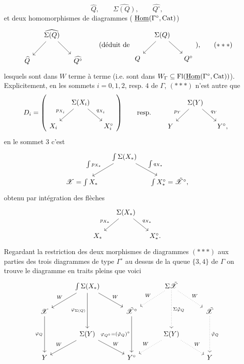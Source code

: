 \[
\widehat{Q}, \qquad \widehat{\Sigma(Q)}, \qquad \widehat{Q^\circ},
\]
et deux homomorphismes de diagrammes ( $\underline{\mathrm{Hom}}(\Gamma^\circ,\mathrm{Cat})$)
\[
\begin{tikzcd}[column sep=small]
 & \widehat{\Sigma(Q)} \arrow[dl] \arrow[dr] & \\
\widehat{Q} & & \widehat{Q^\circ}
\end{tikzcd}
\qquad
\text{(déduit de }
\begin{tikzcd}[column sep=small]
 & \Sigma(Q) \arrow[dl] \arrow[dr] & \\
Q & & Q^\circ
\end{tikzcd}
\text{),}
\tag*{$(***)$}
\]
lesquels sont dans $W$ terme à terme (i.e. sont dans $W_\Gamma\subseteq\mathrm{Fl}(\underline{\mathrm{Hom}}(\Gamma^\circ,\mathrm{Cat}))$). Explicitement, en les sommets $i=0,1,2$, resp. $4$ de $\Gamma$, $(***)$ n'est autre que
\[
D_i =
\left(
\begin{tikzcd}[column sep=small]
 & \Sigma(X_i) \arrow[dl, "p_{X_i}"'] \arrow[dr, "q_{X_i}"] & \\
X_i & & X_i^\circ
\end{tikzcd}
\right)
\qquad \text{resp.} \qquad
\begin{tikzcd}[column sep=small]
 & \Sigma(Y) \arrow[dl, "p_Y"'] \arrow[dr, "q_Y"] & \\
Y & & Y^\circ,
\end{tikzcd}
\]
en le sommet 3 c'est
\[
\begin{tikzcd}[column sep=small]
 & \int\Sigma(X_*) \arrow[dl, "\int p_{X_*}"'] \arrow[dr, "\int q_{X_*}"] & \\
\sX=\int X_* & & \int X_*^\circ=\tsX^\circ,
\end{tikzcd}
\]
obtenu par intégration des flèches
\[
\begin{tikzcd}[column sep=small]
 & \Sigma(X_*) \arrow[dl, "p_{X_*}"'] \arrow[dr, "q_{X_*}"] & \\
X_* & & X_*^\circ.
\end{tikzcd}
\]
Regardant la restriction des deux morphismes de diagrammes $(***)$ aux parties des trois diagrammes de type $\Gamma^\circ$ au dessus de la queue $\{3,4\}$ de $\Gamma$ on trouve le diagramme en traits pleins que voici
\[
\begin{tikzcd}[column sep=3em, row sep=normal]
 & \int\Sigma(X_*) \arrow[dl, "W"'] \arrow[dr, "W"] \arrow[dd, "\varphi_{\Sigma(Q)}"'] & & \Sigma\tsX \arrow[dl, dotted, "W"'] \arrow[dr, dotted, "W"] \arrow[dd, dotted, "\Sigma\tilde{\varphi}_Q"] & \\
\sX \arrow[dd, "\varphi_Q"'] & & \tsX^\circ \arrow[dd, "\varphi_{Q^\circ}=(\tilde{\varphi}_Q)^\circ"'] & & \tsX \arrow[dd, dotted, "\tilde{\varphi}_Q"] \\
 & \Sigma(Y) \arrow[dl, "W"'] \arrow[dr, "W"] & & \Sigma(Y) \arrow[dl, dotted, "W"'] \arrow[dr, dotted, "W"] & \\
Y & & Y^\circ & & Y
\end{tikzcd}
\]
